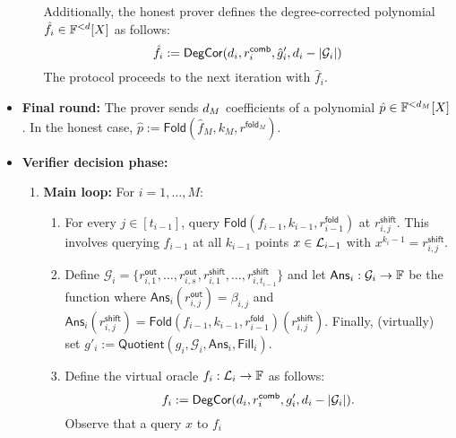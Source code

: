 \begin{itemize}
\begin{enumerate}
    Additionally, the honest prover defines the degree-corrected polynomial 
    $\hat{f}_i \in \mathbb{F}^{<d}[X]$ as follows:
    \[
        \hat{f}_i 
        :=\mathsf{DegCor}(d_i,r_{i}^{\mathsf{comb}},\hat{g}'_i,d_i-|\mathcal{G}_i|)
    \]
  The protocol proceeds to the next iteration with $\hat{f}_i$.
  \end{enumerate}   
  \item \textbf{Final round:} The prover sends $d_M$ coefficients of a polynomial $\hat{p}\in\mathbb{F}^{<d_M}[X]$. In the honest case, $\hat{p}:=\mathsf{Fold}(\hat{f}_M,k_M,r^{\mathsf{fold}_M})$.
  \item \textbf{Verifier decision phase:} 
  \begin{enumerate}
    \item \textbf{Main loop:} For $i=1,\ldots,M:$
    \begin{enumerate}
        \item For every $j\in [t_{i-1}]$, query $\mathsf{Fold}(f_{i-1},k_{i-1},r^{\mathsf{fold}}_{i-1})$ at $r^{\mathsf{shift}}_{i,j}$. This involves querying $f_{i-1}$ at all $k_{i-1}$ points $x\in{\mathcal{L}}_{i-1}$ with $x^{k_i-1}=r^{\mathsf{shift}}_{i,j}$.
        \item Define $\mathcal{G}_i=\{r^{\mathsf{out}}_{i,1},\ldots,r^{\mathsf{out}}_{i,s},r^{\mathsf{shift}}_{i,1},\ldots,r^{\mathsf{shift}}_{i,t_{i-1}}\}$ and let $\mathsf{Ans}_i:\mathcal{G}_i\rightarrow\mathbb{F}$ be the function where $\mathsf{Ans}_i(r^{\mathsf{out}}_{i,j})=\beta_{i,j}$ and $\mathsf{Ans}_{i}(r^{\mathsf{shift}}_{i,j})=\mathsf{Fold}(f_{i-1},k_{i-1},r^{\mathsf{fold}}_{i-1})(r^{\mathsf{shift}}_{i,j})$. Finally, (virtually) set $g'_i:=\mathsf{Quotient}(g_i,\mathcal{G}_i,\mathsf{Ans}_i,\mathsf{Fill}_i)$.
        \item Define the virtual oracle $f_i:\mathcal{L}_i\rightarrow\mathbb{F}$ as follows:
        \[
            f_i:=\mathsf{DegCor}(d_i,r^{\mathsf{comb}}_i,g'_i,d_i-|\mathcal{G}_i|).
        \]
        Observe that a query $x$ to $f_i$
    \end{enumerate}
  \end{enumerate}
\end{itemize}

